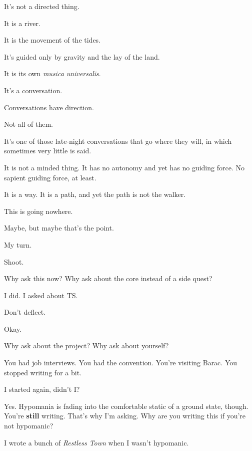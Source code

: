 \begin{paracol}{2}
\begin{leftcolumn}
It's not a directed thing.

It is a river.

It is the movement of the tides.

It's guided only by gravity and the lay of the land.

It is its own \emph{musica universalis}.

It's a conversation.

\begin{ally}
Conversations have direction.
\end{ally}
Not all of them.

It's one of those late-night conversations that go where they will, in which sometimes very little is said.

It is not a minded thing. It has no autonomy and yet has no guiding force. No sapient guiding force, at least.

It is a way. It is a path, and yet the path is not the walker.

\begin{ally}
This is going nowhere.
\end{ally}
Maybe, but maybe that's the point.
\newpage
\label{ally:22}

\noindent My turn.

\begin{ally}
Shoot.
\end{ally}
Why ask this now? Why ask about the core instead of a side quest?

\begin{ally}
I did. I asked about TS.
\end{ally}
Don't deflect.

\begin{ally}
Okay.
\end{ally}
Why ask about the project? Why ask about yourself?

\begin{ally}
You had job interviews. You had the convention. You're visiting Barac. You stopped writing for a bit.
\end{ally}
I started again, didn't I?

\begin{ally}
Yes. Hypomania is fading into the comfortable static of a ground state, though. You're \textbf{still} writing. That's why I'm asking. Why are you writing this if you're not hypomanic?
\end{ally}
I wrote a bunch of \emph{Restless Town} when I wasn't hypomanic.


\end{leftcolumn}
\end{paracol}
